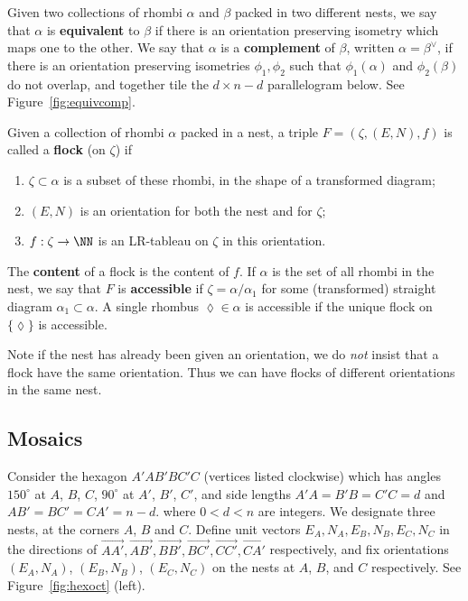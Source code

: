 Given two collections of rhombi $\alpha$ and $\beta$ packed in
two different nests, we say that $\alpha$ is {\bf equivalent}
to $\beta$ if there is an orientation preserving isometry which maps 
one to the other.  We say that $\alpha$ is a {\bf complement} of
$\beta$, written $\alpha = \beta^\vee$,  if there is an orientation 
preserving isometries $\phi_1, \phi_2$ such that $\phi_1(\alpha)$ and 
$\phi_2(\beta)$ 
do not overlap, and together tile the $d \times n{-}d$ parallelogram 
below.  See Figure~\ref{fig:equivcomp}.
\begin{center}
\end{center}

Given a collection of rhombi $\alpha$ packed in a nest, a triple
$F = (\zeta,(E,N),f)$ is called a {\bf flock} (on $\zeta$) if
\begin{enumerate}
\item[(i)] $\zeta \subset \alpha$ is a subset of these rhombi, in the 
shape of a transformed diagram;
\item[(ii)]
$(E,N)$ is an orientation for both the nest and for $\zeta$;
\item[(iii)] $f:\zeta \to \NN$ is an LR-tableau on $\zeta$ 
in this orientation.
\end{enumerate}
The {\bf content} of a flock is the content of $f$.
If $\alpha$ is the set of all rhombi in the nest, we say that $F$ is 
{\bf accessible} if $\zeta = \alpha/\alpha_1$ for 
some (transformed) straight diagram $\alpha_1 \subset \alpha$.  
A single rhombus $\lozenge \in \alpha$ is accessible if the unique 
flock on $\{\lozenge\}$ is accessible.

Note if the nest has already been given an orientation, we do {\em not}
insist
that a flock have the same orientation.  Thus we can have flocks
of different orientations in the same nest.




\subsection{Mosaics}
\label{sec:mosaics}
Consider the hexagon $A'AB'BC'C$ (vertices listed clockwise) which has 
angles $150^\circ$ at $A$, $B$, $C$,
$90^\circ$ at $A'$, $B'$, $C'$, and side lengths
$A'A = B'B = C'C = d$ and $AB' = BC' = CA' = n-d$.
where $0 < d < n$ are integers.  We designate three nests,
at the corners $A$, $B$ and $C$.  Define unit vectors
$E_A, N_A, E_B, N_B, E_C, N_C$ in the directions of 
$\overrightarrow{AA'}, \overrightarrow{AB'}, 
\overrightarrow{BB'}, \overrightarrow{BC'}, 
\overrightarrow{CC'}, \overrightarrow{CA'}$ respectively, and
fix orientations $(E_A, N_A)$, $(E_B, N_B)$, $(E_C, N_C)$ 
on the nests at $A$, $B$, and $C$ respectively.  See 
Figure~\ref{fig:hexoct} (left).

